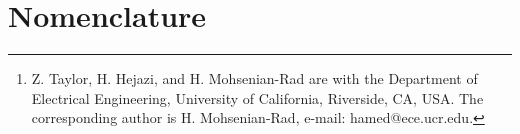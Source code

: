 \documentclass[10pt,twocolumn]{IEEEtran}
\begin{document}
\title{\fontsize{22.5pt}{27pt}\selectfont{Detailed Modeling of Battery in Optimal Energy Storage Operation:  Cell Removal Impact on Capacity }\vspace{0.05cm}}

\author{Zach Taylor, , Hossein Akhavan-Hejazi, , and Hamed Mohsenian-Rad, 

\thanks{Z. Taylor, H. Hejazi, and H. Mohsenian-Rad are with the Department of Electrical Engineering, University of California, Riverside, CA, USA.  The corresponding author is H. Mohsenian-Rad, e-mail: hamed@ece.ucr.edu.} \vspace{-0.5cm}}

\maketitle

\vspace{-0.4cm}

\begin{abstract}
Abstract Here
\vspace{0.3cm}
\textbf{\emph{Keywords}}: keyword1, keyword2, keyword3.
\end{abstract}

\vspace{-0.1cm}

\section*{Nomenclature}

\end{document}
